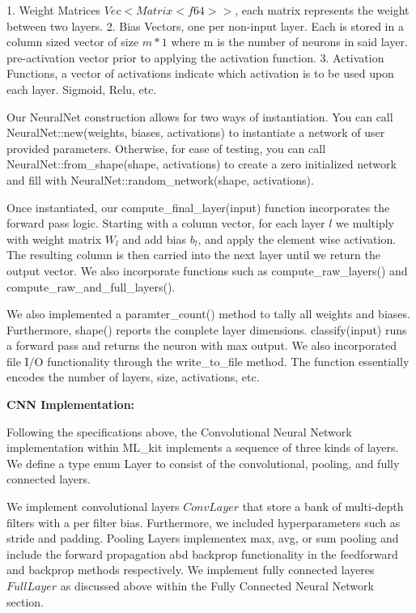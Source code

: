 1. Weight Matrices $Vec<Matrix<f64>>$, each matrix represents the weight between two layers. 
2. Bias Vectors, one per non-input layer. Each is stored in a column sized vector of size $m * 1$ where m is the number of neurons in said layer. 
pre-activation vector prior to applying the activation function. 
3. Activation Functions, a vector of activations indicate which activation is to be used upon each layer. Sigmoid, Relu, etc. 

Our NeuralNet construction allows for two ways of instantiation. You can call NeuralNet::new(weights, biases, activations) 
to instantiate a network of user provided parameters. Otherwise, for ease of testing, you can call NeuralNet::from_shape(shape, activations)
to create a zero initialized network and fill with NeuralNet::random_network(shape, activations). 

Once instantiated, our compute_final_layer(input) function incorporates the forward pass logic. Starting with a column vector, for each layer 
$l$ we multiply with weight matrix $W_l$ and add bias $b_l$, and apply the element wise activation. The resulting column is then 
carried into the next layer until we return the output vector. We also incorporate functions such as compute_raw_layers() and compute_raw_and_full_layers(). 

We also implemented a paramter_count() method to tally all weights and biases. Furthermore, shape() reports the complete layer dimensions. 
classify(input) runs a forward pass and returns the neuron with max output. We also incorporated file I/O functionality through the write_to_file 
method. The function essentially encodes the number of layers, size, activations, etc.  


\begin{center}
 \textbf{CNN Implementation:}
\end{center}

Following the specifications above, the Convolutional Neural Network implementation within ML_kit implements a sequence of three kinds of layers. 
We define a type enum Layer to consist of the convolutional, pooling, and fully connected layers. 

We implement convolutional layers $ConvLayer$ that store a bank of multi-depth filters with a per filter bias. Furthermore, we included hyperparameters 
such as stride and padding. Pooling Layers implementex max, avg, or sum pooling and include the forward propagation abd backprop functionality in the feedforward 
and backprop methods respectively. We implement fully connected layeres $FullLayer$ as discussed above within the Fully Connected Neural Network section. 

